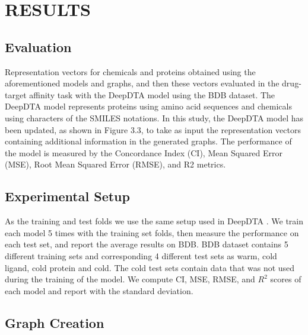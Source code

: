 \chapter{RESULTS}

\section{Evaluation}
Representation vectors for chemicals and proteins obtained using the aforementioned models and graphs, and then these vectors evaluated in the drug-target affinity task with the DeepDTA model using the BDB dataset. The DeepDTA model represents proteins using amino acid sequences and chemicals using characters of the SMILES notations. In this study, the DeepDTA model has been updated, as shown in Figure 3.3, to take as input the representation vectors containing additional information in the generated graphs. The performance of the model is measured by the Concordance Index (CI),  Mean Squared Error (MSE), Root Mean Squared Error (RMSE), and R2 metrics. 


\section{Experimental Setup}

As the training and test folds we use the same setup used in DeepDTA \cite{ozturk2018deepdta}. We train each model 5 times with the training set folds, then measure the performance on each test set, and report the average results on BDB. BDB dataset contains 5 different training sets and corresponding 4 different test sets as warm, cold ligand, cold protein and cold. The cold test sets contain data that was not used during the training of the model. We compute CI, MSE, RMSE, and $R^2$ scores of each model and report with the standard deviation.


\section{Graph Creation}

